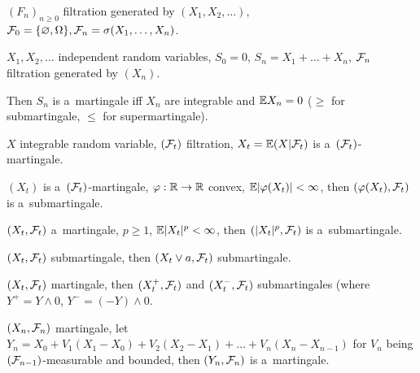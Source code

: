 	\begin{definition}
		$(F_n)_{n \geq 0}$ filtration generated by $(X_1, X_2, \ldots)$, $\mathcal{F}_0 = \{ \varnothing, \Omega\}, \mathcal{F}_n = \sigma(X_1, \ldots, X_n)$.
	\end{definition}
	
	\begin{example}
		$X_1, X_2, \ldots$ independent random variables, $S_0 = 0$, $S_n = X_1 + \ldots + X_n$, $\mathcal{F}_n$ filtration generated by $(X_n)$.
		
		Then $S_n$ is a~martingale iff $X_n$ are integrable and $\mathbb{E} X_n = 0$ ($\geq$ for submartingale, $\leq$ for supermartingale).
	\end{example}
	
	\begin{example}
		$X$ integrable random variable, $(\mathcal{F}_t)$ filtration, $X_t = \mathbb{E}(X | \mathcal{F}_t)$ is a~$(\mathcal{F}_t)$-martingale.
	\end{example}
	
	\begin{example}
		$(X_t)$ is a~$(\mathcal{F}_t)$-martingale, $\varphi:\mathbb{R} \to \mathbb{R}$ convex, $\mathbb{E} |\varphi(X_t)| < \infty$, then $(\varphi(X_t), \mathcal{F}_t)$ is a~submartingale.
	\end{example}
	
	\begin{corollary}
		$(X_t, \mathcal{F}_t)$ a~martingale, $p \geq 1$, $\mathbb{E} |X_t|^p < \infty$, then $(|X_t|^p, \mathcal{F}_t)$ is a~submartingale.
	\end{corollary}
	
	\begin{corollary}
		$(X_t, \mathcal{F}_t)$ submartingale, then $(X_t \vee a, \mathcal{F}_t)$ submartingale.
	\end{corollary}
	
	\begin{corollary}
		$(X_t, \mathcal{F}_t)$ martingale, then $(X_t^+, \mathcal{F}_t)$ and $(X_t^-, \mathcal{F}_t)$ submartingales (where $Y^+ = Y \wedge 0$, $Y^- = (-Y) \wedge 0$.
	\end{corollary}
	
	\begin{example}
		$(X_n, \mathcal{F}_n)$ martingale, let $Y_n = X_0 + V_1(X_1 - X_0) + V_2 (X_2 - X_1) + \ldots + V_n (X_n - X_{n-1})$ for $V_n$ being $(\mathcal{F}_{n-1})$-measurable and bounded, then $(Y_n, \mathcal{F}_n)$ is a~martingale.
	\end{example}









 
 
